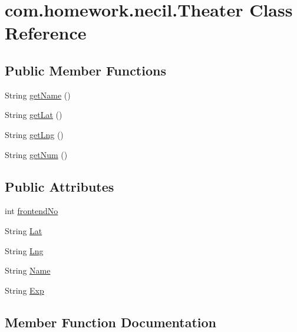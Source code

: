 \hypertarget{classcom_1_1homework_1_1necil_1_1_theater}{}\section{com.\+homework.\+necil.\+Theater Class Reference}
\label{classcom_1_1homework_1_1necil_1_1_theater}
\subsection*{Public Member Functions}
\begin{DoxyCompactItemize}
\item 
String \hyperlink{classcom_1_1homework_1_1necil_1_1_theater_a9e347ca08349bd76ac0fe44040120517}{get\+Name} ()
\item 
String \hyperlink{classcom_1_1homework_1_1necil_1_1_theater_ab349e76e256f7fca41a6f3c00e923eb6}{get\+Lat} ()
\item 
String \hyperlink{classcom_1_1homework_1_1necil_1_1_theater_a2c98b094a865dc6ab9302f8fd6a5cba1}{get\+Lng} ()
\item 
String \hyperlink{classcom_1_1homework_1_1necil_1_1_theater_a770eae0cf18844454c86d1d5d3f6af18}{get\+Num} ()
\end{DoxyCompactItemize}
\subsection*{Public Attributes}
\begin{DoxyCompactItemize}
\item 
int \hyperlink{classcom_1_1homework_1_1necil_1_1_theater_a686cbca2d014424c635160d83f35eed5}{frontend\+No}
\item 
String \hyperlink{classcom_1_1homework_1_1necil_1_1_theater_a9d5a688d48028c85f0377fba0b51afac}{Lat}
\item 
String \hyperlink{classcom_1_1homework_1_1necil_1_1_theater_a45d29c38e335f0fbb606b9556e418700}{Lng}
\item 
String \hyperlink{classcom_1_1homework_1_1necil_1_1_theater_aab1cd7ccbd3c65248fcde5846356e87c}{Name}
\item 
String \hyperlink{classcom_1_1homework_1_1necil_1_1_theater_ad503f6d92e7c4b93aca14473eca15f50}{Exp}
\end{DoxyCompactItemize}


\subsection{Member Function Documentation}
